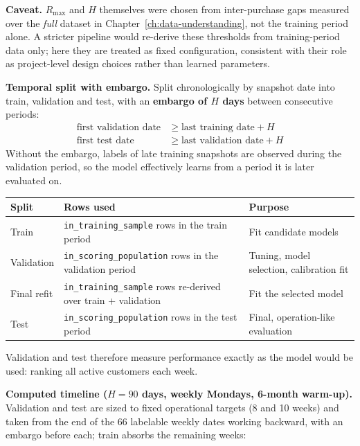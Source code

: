 \textbf{Caveat.} $R_{\max}$ and $H$ themselves were chosen from inter-purchase gaps measured over the \emph{full} dataset in Chapter~\ref{ch:data-understanding}, not the training period alone. A stricter pipeline would re-derive these thresholds from training-period data only; here they are treated as fixed configuration, consistent with their role as project-level design choices rather than learned parameters.

\textbf{Temporal split with embargo.} Split chronologically by snapshot date into train, validation and test, with an \textbf{embargo of $H$ days} between consecutive periods:
\begin{align*}
    \text{first validation date} &\geq \text{last training date} + H \\
    \text{first test date} &\geq \text{last validation date} + H
\end{align*}
Without the embargo, labels of late training snapshots are observed during the validation period, so the model effectively learns from a period it is later evaluated on.

\begin{center}
\begin{tabular}{@{}p{2.6cm}p{6.4cm}p{5cm}@{}}
    \toprule
    Split & Rows used & Purpose \\
    \midrule
    Train & \texttt{in\_training\_sample} rows in the train period & Fit candidate models \\
    Validation & \texttt{in\_scoring\_population} rows in the validation period & Tuning, model selection, calibration fit \\
    Final refit & \texttt{in\_training\_sample} rows re-derived over train + validation & Fit the selected model \\
    Test & \texttt{in\_scoring\_population} rows in the test period & Final, operation-like evaluation \\
    \bottomrule
\end{tabular}
\end{center}

Validation and test therefore measure performance exactly as the model would be used: ranking all active customers each week.

\textbf{Computed timeline ($H = 90$ days, weekly Mondays, 6-month warm-up).} Validation and test are sized to fixed operational targets (8 and 10 weeks) and taken from the end of the 66 labelable weekly dates working backward, with an embargo before each; train absorbs the remaining weeks:

